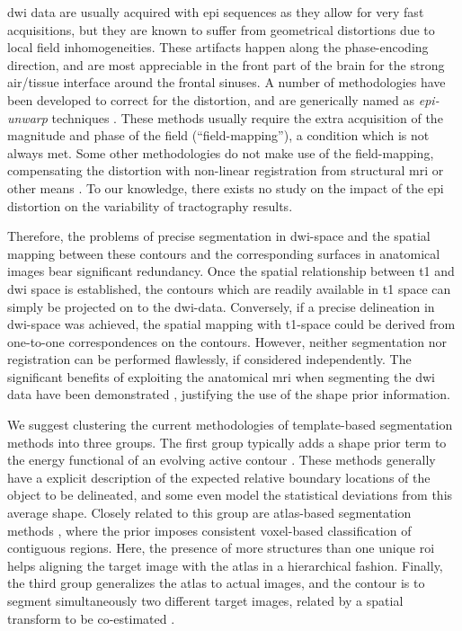\gls{dwi} data are usually acquired with \gls{epi} sequences 
as they allow for very fast acquisitions, but they are known to 
suffer from geometrical distortions due to local field inhomogeneities. 
These artifacts happen along the phase-encoding direction, and are most 
appreciable in the front part of the brain for the strong air/tissue 
interface around the frontal sinuses. A number of methodologies have
been developed to correct for the distortion, and are generically named 
as \emph{\gls{epi}-unwarp} techniques
\cite{holland_efficient_2010,hsu_correction_2009,jezzard_characterization_2005,
reber_correction_2005}. These methods usually 
require the extra acquisition of the magnitude and phase of
the field (``field-mapping''), a condition which is not always met. Some other 
methodologies do not make use of the field-mapping, compensating the distortion
with non-linear registration from structural \gls{mri} or other means
\citep{andersson_modeling_2001}. To our knowledge, there exists no study
on the impact of the \gls{epi} distortion on the variability of tractography
results. 

Therefore, the problems of precise segmentation in \gls{dwi}-space and the 
spatial mapping between these contours and the corresponding surfaces in 
anatomical images bear significant redundancy. Once the spatial relationship 
between \gls{t1} and \gls{dwi} space is established, the contours which are 
readily available in \gls{t1} space can simply be projected on to the 
\gls{dwi}-data. Conversely, if a precise delineation in \gls{dwi}-space 
was achieved, the spatial mapping with \gls{t1}-space could be derived 
from one-to-one correspondences on the contours. However, neither segmentation 
nor registration can be performed flawlessly, if considered independently. 
The significant benefits of exploiting the anatomical \gls{mri} when 
segmenting the \gls{dwi} data have been demonstrated \cite{zollei_improved_2010}, 
justifying the use of the shape prior information. 

We suggest clustering the current methodologies of template-based segmentation 
methods into three groups. The first group typically adds a shape prior term to 
the energy functional of an evolving active contour
\citep{bresson_variational_2006,chan_level_2005,chen_using_2002,cremers_kernel_2006,
gastaud_combining_2004,paragios_level_2003,vemuri_joint_2003,yezzi_variational_2003}.
These methods generally have a explicit description of the expected relative boundary 
locations of the object to be delineated, and some even model the statistical deviations
from this average shape. Closely related to this group are atlas-based segmentation
methods \citep{gorthi_segmentation_2009,gorthi_active_2011,pohl_unifying_2005,
pohl_bayesian_2006,wang_joint_2006}, where the prior 
imposes consistent voxel-based classification of contiguous regions. Here, the 
presence of more structures than one unique \gls{roi} helps aligning the target image 
with the atlas in a hierarchical fashion. Finally, the third group generalizes 
the atlas to actual images, and the contour is to segment simultaneously two 
different target images, related by a spatial transform to be co-estimated
\citep{wyatt_map_2003,yezzi_variational_2003}.

